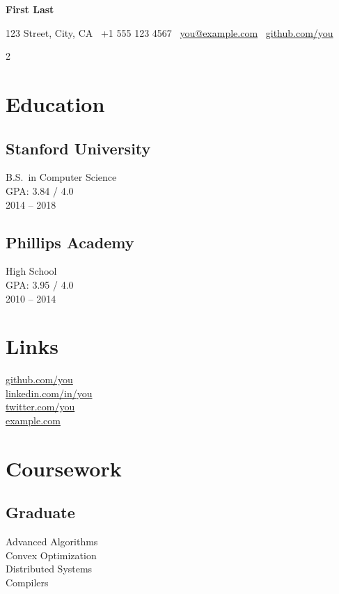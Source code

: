 \documentclass[10pt,letterpaper]{article}
\begin{document}
\centerline{\Huge\bfseries First Last}
\vspace{4pt}
\centerline{\small 123 Street, City, CA \textbullet\ +1 555 123 4567 \textbullet\ \href{mailto:you@example.com}{you@example.com} \textbullet\ \href{https://github.com/you}{github.com/you}}

\vspace{12pt}
\begin{paracol}{2}

\section*{Education}
\subsection*{Stanford University}
B.S.\ in Computer Science \\
{\footnotesize GPA: 3.84 / 4.0} \\
{\footnotesize 2014 -- 2018}

\subsection*{Phillips Academy}
High School \\
{\footnotesize GPA: 3.95 / 4.0} \\
{\footnotesize 2010 -- 2014}

\vspace{4pt}
\section*{Links}
\href{https://github.com/you}{github.com/you} \\
\href{https://linkedin.com/in/you}{linkedin.com/in/you} \\
\href{https://twitter.com/you}{twitter.com/you} \\
\href{https://example.com}{example.com}

\vspace{4pt}
\section*{Coursework}
\subsection*{Graduate}
Advanced Algorithms \\
Convex Optimization \\
Distributed Systems \\
Compilers


\end{paracol}
\end{document}
